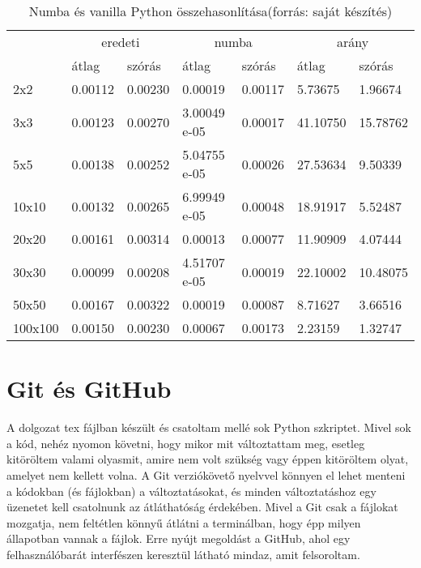 \documentclass{article}
\theoremstyle{definition}
\theoremstyle{theorem}
\begin{document}
\begin{table}[]
\centering
\caption{Numba és vanilla Python összehasonlítása(forrás: saját készítés)}
\begin{tabular}{l|ll|ll|ll|}
\cline{2-7}
                              & \multicolumn{2}{c|}{eredeti}           & \multicolumn{2}{c|}{numba}             & \multicolumn{2}{c|}{arány}              \\ \cline{2-7}
                              & \multicolumn{1}{l|}{átlag}   & szórás  & \multicolumn{1}{l|}{átlag}   & szórás  & \multicolumn{1}{l|}{átlag}    & szórás  \\ \hline
\multicolumn{1}{|l|}{2x2}     & \multicolumn{1}{l|}{0.00112} & 0.00230 & \multicolumn{1}{l|}{0.00019} & 0.00117 & \multicolumn{1}{l|}{5.73675}  & 1.96674 \\ \hline
\multicolumn{1}{|l|}{3x3}   & \multicolumn{1}{l|}{0.00123} & 0.00270 & \multicolumn{1}{l|}{3.00049 e-05} & 0.00017 & \multicolumn{1}{l|}{41.10750} & 15.78762 \\ \hline
\multicolumn{1}{|l|}{5x5}   & \multicolumn{1}{l|}{0.00138} & 0.00252 & \multicolumn{1}{l|}{5.04755 e-05} & 0.00026 & \multicolumn{1}{l|}{27.53634} & 9.50339  \\ \hline
\multicolumn{1}{|l|}{10x10} & \multicolumn{1}{l|}{0.00132} & 0.00265 & \multicolumn{1}{l|}{6.99949 e-05} & 0.00048 & \multicolumn{1}{l|}{18.91917} & 5.52487  \\ \hline
\multicolumn{1}{|l|}{20x20}   & \multicolumn{1}{l|}{0.00161} & 0.00314 & \multicolumn{1}{l|}{0.00013} & 0.00077 & \multicolumn{1}{l|}{11.90909} & 4.07444 \\ \hline
\multicolumn{1}{|l|}{30x30} & \multicolumn{1}{l|}{0.00099} & 0.00208 & \multicolumn{1}{l|}{4.51707 e-05} & 0.00019 & \multicolumn{1}{l|}{22.10002} & 10.48075 \\ \hline
\multicolumn{1}{|l|}{50x50}   & \multicolumn{1}{l|}{0.00167} & 0.00322 & \multicolumn{1}{l|}{0.00019} & 0.00087 & \multicolumn{1}{l|}{8.71627}  & 3.66516 \\ \hline
\multicolumn{1}{|l|}{100x100} & \multicolumn{1}{l|}{0.00150} & 0.00230 & \multicolumn{1}{l|}{0.00067} & 0.00173 & \multicolumn{1}{l|}{2.23159}  & 1.32747 \\ \hline
\end{tabular}
\end{table}
\section{Git és GitHub}
A dolgozat tex fájlban készült és csatoltam mellé sok Python szkriptet. Mivel sok a kód, nehéz nyomon követni, hogy mikor mit változtattam meg, esetleg kitöröltem valami olyasmit, amire nem volt szükség vagy éppen kitöröltem olyat, amelyet nem kellett volna. A Git verziókövető nyelvvel könnyen el lehet menteni a kódokban (és fájlokban) a változtatásokat, és minden változtatáshoz egy üzenetet kell csatolnunk az átláthatóság érdekében. Mivel a Git csak a fájlokat mozgatja, nem feltétlen könnyű átlátni a terminálban, hogy épp milyen állapotban vannak a fájlok. Erre nyújt megoldást a GitHub, ahol egy felhasználóbarát interfészen keresztül látható mindaz, amit felsoroltam.
\end{document}
